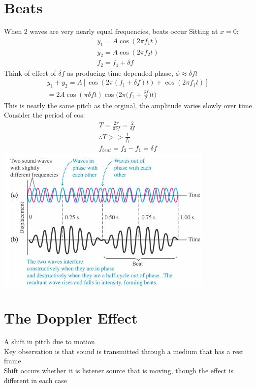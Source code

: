 \documentclass[a4paper, 11pt, fleqn, normalem]{report}
\begin{document}
\section{Beats}
When 2 waves are very nearly equal frequencies, beats occur
Sitting at $x = 0$:
\begin{gather*}
    y_{1} = A\cos{(2\pi f_{1}t)} \\
    y_{2} = A\cos{(2\pi f_{2}t)} \\
    f_{2} = f_{1} + \delta f
\end{gather*}
Think of effect of $\delta f$ as producing time-depended phase, $\phi \approx \delta ft$
\begin{gather*}
    y_{1} + y_{2} = A[\cos{(2\pi(f_{1} + \delta f)t)} + \cos{(2\pi f_{1}t)}] \\
    = 2A\cos{(\pi\delta ft)}\cos{\Big(2\pi\Big(f_{1} + \frac{\delta f}{2}\Big)t\Big)}
\end{gather*}
This is nearly the same pitch as the orginal, the amplitude varies slowly over time \\
Consider the period of cos:
\begin{gather*}
    T = \frac{2\pi}{\pi\delta f} = \frac{2}{\delta f} \\
    \therefore T >> \frac{1}{f_{1}} \\
    f_{beat} = f_{2} - f_{1} = \delta f
\end{gather*}
\includegraphics[scale=0.8]{Beat.jpg}

\section{The Doppler Effect}
A shift in pitch due to motion \\
Key observation is that sound is transmitted through a medium that has a rest frame \\
Shift occurs whether it is listener source that is moving, though the effect is different in each case
\end{document}
